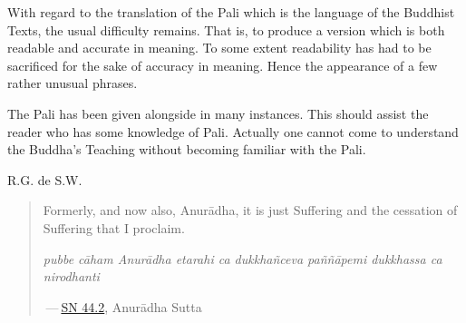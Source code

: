 With regard to the translation of the Pali which is the language of the Buddhist Texts, the usual difficulty remains. That is, to produce a version which is both readable and accurate in meaning. To some extent readability has had to be sacrificed for the sake of accuracy in meaning. Hence the appearance of a few rather unusual phrases.

The Pali has been given alongside in many instances. This should assist the reader who has some knowledge of Pali. Actually one cannot come to understand the Buddha's Teaching without becoming familiar with the Pali.

R.G. de S.W.

\begin{quote}
Formerly, and now also, Anurādha, it is just Suffering and the cessation of Suffering that I proclaim.

\emph{pubbe cāham Anurādha etarahi ca dukkhañceva paññāpemi dukkhassa ca nirodhanti}

 --- \href{https://suttacentral.net/sn44.2/en/sujato}{SN 44.2}, Anurādha Sutta
\end{quote}
